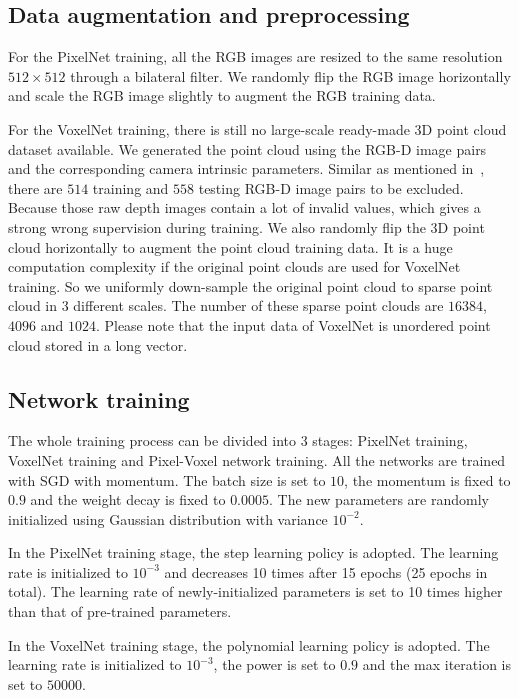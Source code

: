 \documentclass[letterpaper, 10 pt, conference]{ieeeconf}
\begin{document}
\subsection{Data augmentation and preprocessing}\label{sec:4.1}
For the PixelNet training, all the RGB images are resized to the same resolution $512 \times 512$ through a bilateral filter. We randomly flip the RGB image horizontally and scale the RGB image slightly to augment the RGB training data. 

For the VoxelNet training, there is still no large-scale ready-made 3D point cloud dataset available. We generated the point cloud using the RGB-D image pairs and the corresponding camera intrinsic parameters. Similar as mentioned in~\cite{hazirbas2016fusenet}, there are $514$ training and $558$ testing RGB-D image pairs to be excluded. Because those raw depth images contain a lot of invalid values, which gives a strong wrong supervision during training. We also randomly flip the 3D point cloud horizontally to augment the point cloud training data. It is a huge computation complexity if the original point clouds are used for VoxelNet training. So we uniformly down-sample the original point cloud to sparse point cloud in 3 different scales. The number of these sparse point clouds are $16384$, $4096$ and $1024$. Please note that the input data of VoxelNet is unordered point cloud stored in a long vector.    

\subsection{Network training}\label{sec:4.2}
The whole training process can be divided into 3 stages: PixelNet training, VoxelNet training and Pixel-Voxel network training. All the networks are trained with SGD with momentum. The batch size is set to $10$, the momentum is fixed to $0.9$ and the weight decay is fixed to $0.0005$. The new parameters are randomly initialized using Gaussian distribution with variance $10^{-2}$. 

In the PixelNet training stage, the step learning policy is adopted. The learning rate is initialized to $10^{-3}$ and decreases 10 times after 15 epochs (25 epochs in total). The learning rate of newly-initialized parameters is set to 10 times higher than that of pre-trained parameters. 

In the VoxelNet training stage, the polynomial learning policy is adopted. The learning rate is initialized to $10^{-3}$, the power is set to $0.9$ and the max iteration is set to $50000$. %
\end{document}
